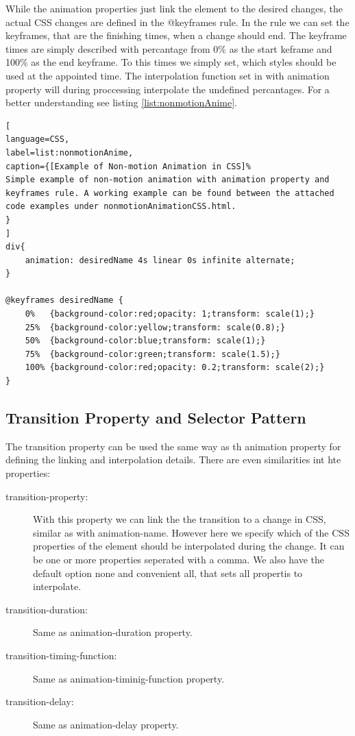 While the animation properties just link the element to the desired changes, the actual CSS changes are defined in the @keyframes rule. In the rule we can set the keyframes, that are the finishing times, when a change should end. The keyframe times are simply described with percantage from 0\% as the start keframe and 100\% as the end keyframe. To this times we simply set, which styles should be used at the appointed time. The interpolation function set in with animation property will during proccessing interpolate the undefined percantages. For a better understanding see listing \ref{list:nonmotionAnime}.


\begin{lstlisting}[
language=CSS,
label=list:nonmotionAnime,
caption={[Example of Non-motion Animation in CSS]%
Simple example of non-motion animation with animation property and keyframes rule. A working example can be found between the attached code examples under nonmotionAnimationCSS.html.
}
]
div{
	animation: desiredName 4s linear 0s infinite alternate;
}

@keyframes desiredName {
	0%   {background-color:red;opacity: 1;transform: scale(1);}
	25%  {background-color:yellow;transform: scale(0.8);}
	50%  {background-color:blue;transform: scale(1);}
	75%  {background-color:green;transform: scale(1.5);}
	100% {background-color:red;opacity: 0.2;transform: scale(2);}
}
\end{lstlisting}

\subsection{Transition Property and Selector Pattern} %
\label{sub:CSS_transition}

The transition property can be used the same way as th animation property for defining the linking and interpolation details. There are even similarities int hte properties:

\begin{description}
\item [transition-property:] With this property we can link the the transition to a change in CSS, similar as with animation-name. However here we specify which of the CSS properties of the element should be interpolated during the change. It can be one or more properties seperated with a comma. We also have the default option none and convenient all, that sets all propertis to interpolate.
\item [transition-duration:] Same as animation-duration property.
\item [transition-timing-function:] Same as animation-timinig-function property.
\item [transition-delay:] Same as animation-delay property.
\end{description}

